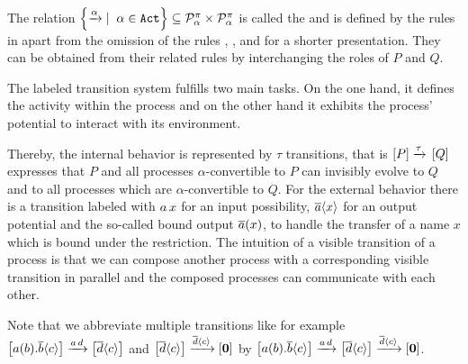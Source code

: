 \begin{definition}
\label{def_early_trans_system}
The relation $\set[\alpha\in\actions]{\transs{\alpha}}\subseteq\procs_\alpha\times\procs_\alpha$ is called the  and is defined by the rules in  apart from the omission of the rules \esumr{}, \eparr{}, \ecomr{} and \ecloser{} for a shorter presentation. They can be obtained from their related rules by interchanging the roles of $P$ and $Q$.
\end{definition}



The labeled transition system fulfills two main tasks. On the one hand, it defines the activity within the process and on the other hand it exhibits the process' potential to interact with its environment.

Thereby, the internal behavior is represented by $\tau$ transitions, that is $\left[P\right]\xrightarrow{\tau}{}\left[Q\right]$ expresses that $P$ and all processes $\alpha$-convertible to $P$ can invisibly evolve to $Q$ and to all processes which are $\alpha$-convertible to $Q$. For the external behavior there is a transition labeled with $a\,x$ for an input possibility, $\overline{a}\langle x\rangle$ for an output potential and the so-called bound output $\overline{a}(x)$, to handle the transfer of a name $x$ which is bound under the restriction. The intuition of a visible transition of a process is that we can compose another process with a corresponding visible transition in parallel and the composed processes can communicate with each other.

Note that we abbreviate multiple transitions like for example $\left[a(b).\overline{b}\langle c\rangle\right]\xrightarrow{a\,d}\left[\overline{d}\langle c\rangle\right]$ and $\left[\overline{d}\langle c\rangle\right]\xrightarrow{\overline{d}\langle c\rangle}\left[\mathbf{0}\right]$ by $\left[a(b).\overline{b}\langle c\rangle\right]\xrightarrow{a\,d}\left[\overline{d}\langle c\rangle\right]\xrightarrow{\overline{d}\langle c\rangle}\left[\mathbf{0}\right]$.

